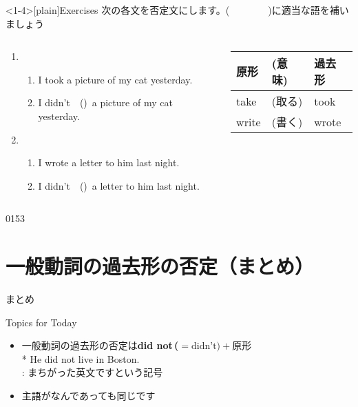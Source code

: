 \documentclass[aspectratio=169,xcolor={dvipsnames,table}]{beamer}
\newcommand{\myaudio}[1]{\href{#1}{\faVolumeUp}}
\begin{document}
\begin{frame}<1-4>[plain]{Exercises}
 次の各文を否定文にします。(~~~~~~~~)に適当な語を補いましょう

\begin{columns}
\begin{column}{.6\textwidth}
\begin{enumerate}
 \item \begin{enumerate}
	\item I took a picture of my cat yesterday.
	\item I didn't~~()\,\,\,a picture of my cat yesterday.
       \end{enumerate}
 \item \begin{enumerate}
	\item I wrote a letter to him last night.
	\item I didn't~~()\,\,\,a letter to him last night.
       \end{enumerate}
\end{enumerate}
\end{column}
\begin{column}{.35\textwidth}
{
\begin{tabular}{lll}\toprule
{\small 原形}&{\small (意味)}&{\small 過去形}\\\midrule
{take}&{{\small (取る)}}&{took}\\
{write}&{{\small (書く)}}&{wrote}\\
\bottomrule
\end{tabular}}%

\end{column}
\end{columns}
\hfill{\tiny 0153}\,{\scriptsize \myaudio{./audio/026_past_didnot_08.mp3}}

\end{frame}

\section{一般動詞の過去形の否定（まとめ）}
\begin{frame}[plain]{まとめ}
 \begin{exampleblock}{Topics for Today}
\small
\begin{itemize}[square]
 \item  一般動詞の過去形の否定は\textcolor{NavyBlue}{\bfseries did not\,($=\text{didn't)} + \text{原形}$}\hfill{} \\
\hfill{* He did not live in Boston.}\\
\hfill{\scriptsize *: まちがった英文ですという記号}

 \item  主語がなんであっても同じです
\end{itemize}
      \end{exampleblock}
\end{frame}
\end{document}
